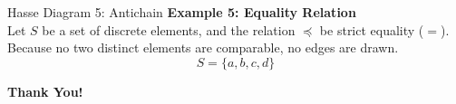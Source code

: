 \documentclass{beamer}
\begin{document}
\begin{frame}{Hasse Diagram 5: Antichain}
    \textbf{Example 5: Equality Relation} \\
    \hspace*{1.5em}Let $S$ be a set of discrete elements, and the relation $\preceq$ be strict equality ($=$). Because no two distinct elements are comparable, no edges are drawn.
    \[ S = \{a, b, c, d\} \]
    
    \vspace{0.8cm}
    
    \begin{center}
    \end{center}
\end{frame}

\begin{frame}
    \centering
    \Huge \textbf{Thank You!}
\end{frame}
\end{document}

